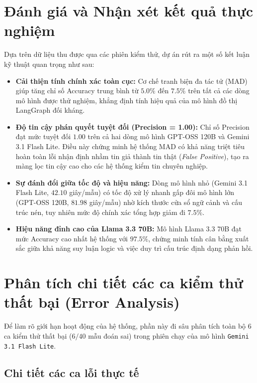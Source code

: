 \documentclass[12pt,a4paper]{report}
\begin{document}
\section{Đánh giá và Nhận xét kết quả thực nghiệm}
Dựa trên dữ liệu thu được qua các phiên kiểm thử, dự án rút ra một số kết luận kỹ thuật quan trọng như sau:
\begin{itemize}
    \item \textbf{Cải thiện tính chính xác toàn cục:} Cơ chế tranh biện đa tác tử (MAD) giúp tăng chỉ số Accuracy trung bình từ $5.0\%$ đến $7.5\%$ trên tất cả các dòng mô hình được thử nghiệm, khẳng định tính hiệu quả của mô hình đồ thị LangGraph đối kháng.
    \item \textbf{Độ tin cậy phán quyết tuyệt đối (Precision = 1.00):} Chỉ số Precision đạt mức tuyệt đối $1.00$ trên cả hai dòng mô hình GPT-OSS 120B và Gemini 3.1 Flash Lite. Điều này chứng minh hệ thống MAD có khả năng triệt tiêu hoàn toàn lỗi nhận định nhầm tin giả thành tin thật (\textit{False Positive}), tạo ra màng lọc tin cậy cao cho các hệ thống kiểm tin chuyên nghiệp.
    \item \textbf{Sự đánh đổi giữa tốc độ và hiệu năng:} Dòng mô hình nhỏ (Gemini 3.1 Flash Lite, $42.10$ giây/mẫu) có tốc độ xử lý nhanh gấp đôi mô hình lớn (GPT-OSS 120B, $81.98$ giây/mẫu) nhờ kích thước cửa sổ ngữ cảnh và cấu trúc nén, tuy nhiên mức độ chính xác tổng hợp giảm đi $7.5\%$.
    \item \textbf{Hiệu năng đỉnh cao của Llama 3.3 70B:} Mô hình Llama 3.3 70B đạt mức Accuracy cao nhất hệ thống với $97.5\%$, chứng minh tính cân bằng xuất sắc giữa khả năng suy luận logic và việc duy trì cấu trúc định dạng phản hồi.
\end{itemize}

\section{Phân tích chi tiết các ca kiểm thử thất bại (Error Analysis)}
Để làm rõ giới hạn hoạt động của hệ thống, phần này đi sâu phân tích toàn bộ $6$ ca kiểm thử thất bại ($6/40$ mẫu đoán sai) trong phiên chạy của mô hình \texttt{Gemini 3.1 Flash Lite}.

\subsection{Chi tiết các ca lỗi thực tế}
\end{document}
